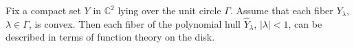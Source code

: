 
Fix a compact set $Y$ in $\mathbb{C}^2$ lying over the unit circle $\Gamma$. Assume that each fiber $Y_\lambda$, $\lambda \in \Gamma$, is convex. Then each fiber of the polynomial hull $\hat{Y}_\lambda$, $|\lambda| < 1$, can be described in terms of function theory on the disk.
